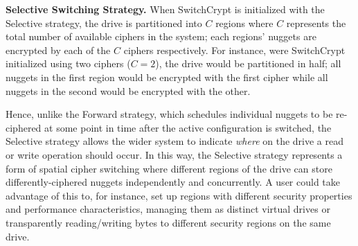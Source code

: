 
\textbf{Selective Switching Strategy.} When SwitchCrypt is initialized with the
Selective strategy, the drive is partitioned into $C$ regions where $C$
represents the total number of available ciphers in the system; each regions'
nuggets are encrypted by each of the $C$ ciphers respectively. For instance,
were SwitchCrypt initialized using two ciphers ($C = 2$), the drive would be
partitioned in half; all nuggets in the first region would be encrypted with the
first cipher while all nuggets in the second would be encrypted with the other.

Hence, unlike the Forward strategy, which schedules individual nuggets to be
re-ciphered at some point in time after the active configuration is switched,
the Selective strategy allows the wider system to indicate \emph{where} on the
drive a read or write operation should occur. In this way, the Selective
strategy represents a form of spatial cipher switching where different regions
of the drive can store differently-ciphered nuggets independently and
concurrently. A user could take advantage of this to, for instance, set up
regions with different security properties and performance characteristics,
managing them as distinct virtual drives or transparently reading/writing bytes
to different security regions on the same drive.

